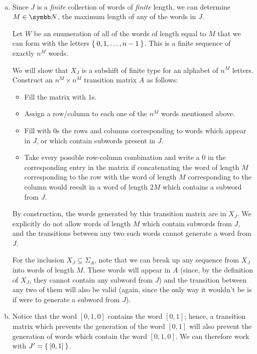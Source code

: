 \begin{problem}
~
\begin{enumerate}[a)]
    \item Since \(J\) is a \emph{finite} collection of words of \emph{finite} length, we can determine \(M \in \naturals\), the maximum length of any of the words in \(J\).

    Let \(W\) be an enumeration of all of the words of length equal to \(M\) that we can form with the letters \(\Set{0, 1, \dots, n-1}\). This is a finite sequence of exactly \(n^M\) words.
    
    We will show that \(X_{J}\) is a subshift of finite type for an alphabet of \(n^M\) letters. Construct an \(n^M \times n^M\) transition matrix \(A\) as follows:
    \begin{itemize}
        \item Fill the matrix with \(1\)s.
        \item Assign a row/column to each one of the \(n^M\) words mentioned above.
        \item Fill with \(0\)s the rows and columns corresponding to words which appear in \(J\), or which contain subwords present in \(J\).
        \item Take every possible row-column combination and write a \(0\) in the corresponding entry in the matrix if concatenating the word of length \(M\) corresponding to the row with the word of length \(M\) corresponding to the column would result in a word of length \(2M\) which contains a subword from \(J\).
    \end{itemize}
    
    By construction, the words generated by this transition matrix are in \(X_J\). We explicitly do not allow words of length \(M\) which contain subwords from \(J\), and the transitions between any two such words cannot generate a word from \(J\).
    
    For the inclusion \(X_J \subseteq \Sigma_A\), note that we can break up any sequence from \(X_J\) into words of length \(M\). These words will appear in \(A\) (since, by the definition of \(X_J\), they cannot contain any subword from \(J\)) and the transition between any two of them will also be valid (again, since the only way it wouldn't be is if were to generate a subword from \(J\)).

    \item Notice that the word \([0, 1, 0]\) contains the word \([0, 1]\); hence, a transition matrix which prevents the generation of the word \([0, 1]\) will also prevent the generation of words which contain the word \([0, 1, 0]\). We can therefore work with \(J' = \Set{ [0, 1] }\).


\end{enumerate}
\end{problem}
